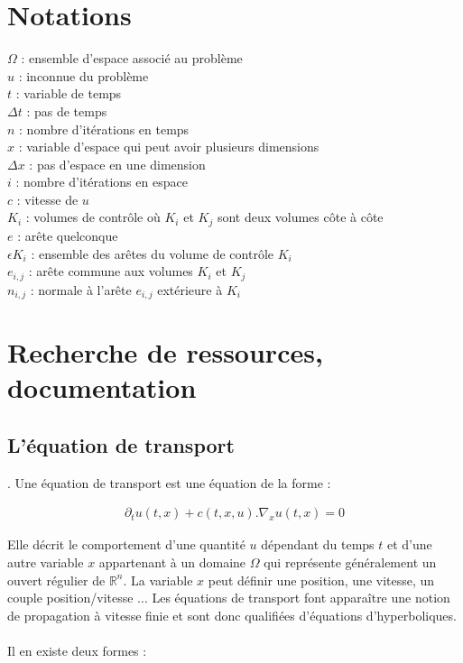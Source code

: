 \documentclass[12pt]{article}
\begin{document}
\section{Notations}

\noindent $\Omega$ : ensemble d'espace associé au problème
\\$u$ : inconnue du problème
\\$t$ : variable de temps
\\$\Delta t$ : pas de temps
\\$n$ : nombre d'itérations en temps
\\$x$ : variable d'espace qui peut avoir plusieurs dimensions
\\$\Delta x$ : pas d'espace en une dimension
\\$i$ : nombre d'itérations en espace
\\$c$ : vitesse de $u$
\\$K_i$ : volumes de contrôle où $K_i$ et $K_j$ sont deux volumes côte à côte
\\$e$ : arête quelconque
\\$\epsilon K_i$ : ensemble des arêtes du volume de contrôle $K_i$
\\$e_{i,j}$ : arête commune aux volumes $K_i$ et $K_j$
\\$n_{i,j}$ : normale à l'arête $e_{i,j}$ extérieure à $K_i$

	
\section{Recherche de ressources, documentation}
\subsection{L'équation de transport}
. Une équation de transport est une équation de la forme :

\begin{eqnarray}
\partial_tu(t,x)+c(t,x,u).\nabla_xu(t,x)=0
\end{eqnarray}

\noindent Elle décrit le comportement d'une quantité $u$ dépendant du temps $t$ et d'une autre variable $x$ appartenant à un domaine $\Omega$ qui représente généralement un ouvert régulier de $\mathbb{R}^n$. La variable $x$ peut définir une position, une vitesse, un couple position/vitesse ... Les équations de transport font apparaître une notion de propagation à vitesse finie et sont donc qualifiées d'équations d'hyperboliques.
\\
\\Il en existe deux formes : 
\end{document}
